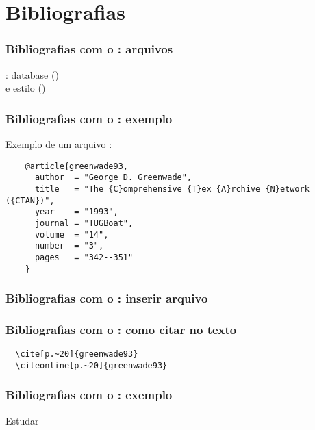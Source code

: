 \section{Bibliografias}

\begin{frame}
  \frametitle{Bibliografias com o : arquivos}
  \LARGE
  : database ()\\
  e estilo ()
\end{frame}

\begin{frame}[fragile]
  \frametitle{Bibliografias com o : exemplo}
  \LARGE
  Exemplo de um arquivo :
  \vspace{1em}

  \begin{verbatim}
    @article{greenwade93,
      author  = "George D. Greenwade",
      title   = "The {C}omprehensive {T}ex {A}rchive {N}etwork ({CTAN})",
      year    = "1993",
      journal = "TUGBoat",
      volume  = "14",
      number  = "3",
      pages   = "342--351"
    }
  \end{verbatim}
\end{frame}

\begin{frame}[fragile]
  \frametitle{Bibliografias com o : inserir arquivo }
  \LARGE
  \latexcode{}
\end{frame}

\begin{frame}[fragile]
  \frametitle{Bibliografias com o : como citar no texto}
  \begin{verbatim}
  \cite[p.~20]{greenwade93}
  \citeonline[p.~20]{greenwade93}
  \end{verbatim}
\end{frame}

\begin{frame}
  \frametitle{Bibliografias com o : exemplo}
  \huge
  Estudar 
\end{frame}
